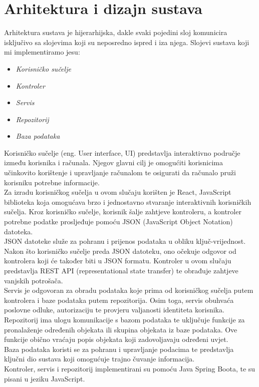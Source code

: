 \chapter{Arhitektura i dizajn sustava}

		{ Arhitektura sustava je hijerarhijska, dakle svaki pojedini sloj
			komunicira isključivo sa slojevima koji su neposredno ispred i iza njega. Slojevi sustava koji mi implementiramo jesu:}
	\begin{itemize}
		\item 	\textit{Korisničko sučelje}
		\item 	\textit{Kontroler}
		\item 	\textit{Servis}
		\item 	\textit{Repozitorij}
		\item 	\textit{Baza podataka}
	\end{itemize}

		{Korisničko sučelje (eng. User interface, UI) predstavlja interaktivno područje između korisnika i računala. Njegov glavni cilj je omogućiti korisnicima učinkovito korištenje i upravljanje računalom te osigurati da računalo pruži korisniku potrebne informacije.\\

			Za izradu korisničkog sučelja u ovom slučaju korišten je React, JavaScript biblioteka koja omogućava brzo i jednostavno stvaranje interaktivnih korisničkih sučelja. Kroz korisničko sučelje, korisnik šalje zahtjeve kontroleru, a kontroler potrebne podatke prosljeđuje pomoću JSON (JavaScript Object Notation) datoteka.\\

			JSON datoteke služe za pohranu i prijenos podataka u obliku ključ-vrijednost. Nakon što korisničko sučelje preda JSON datoteku, ono očekuje odgovor od kontrolera koji će također biti u JSON formatu. Kontroler u ovom slučaju predstavlja REST API (representational state transfer) te obrađuje zahtjeve vanjskih potrošača.\\

			Servis je odgovoran za obradu podataka koje prima od korisničkog sučelja putem kontrolera i baze podataka putem repozitorija. Osim toga, servis obuhvaća poslovne odluke, autorizaciju te provjeru valjanosti identiteta korisnika.\\

			Repozitorij ima ulogu komunikacije s bazom podataka te uključuje funkcije za pronalaženje određenih objekata ili skupina objekata iz baze podataka. Ove funkcije obično vraćaju popis objekata koji zadovoljavaju određeni uvjet.\\

			Baza podataka koristi se za pohranu i upravljanje podacima te predstavlja ključni dio sustava koji omogućuje trajno čuvanje informacija.\\

			Kontroler, servis i repozitorij implementirani su pomoću Java Spring Boota, te su pisani u jeziku JavaScript.}


